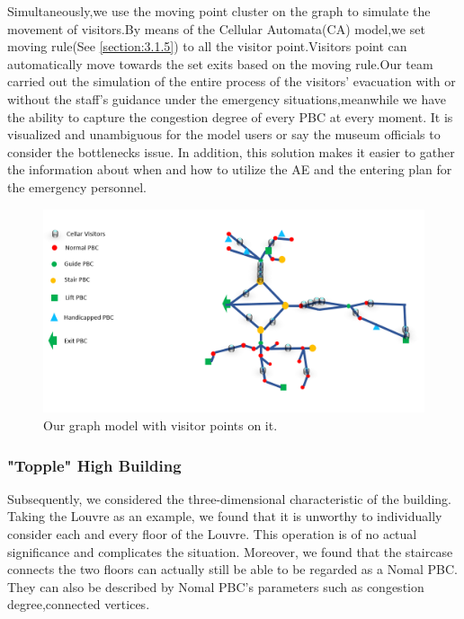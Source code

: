 \documentclass[12pt]{article}
\begin{document}
Simultaneously,we use the moving point cluster on the graph to simulate 
the movement of visitors.By means of the Cellular Automata(CA) model,we set moving rule(See \ref{section:3.1.5}) to all the visitor point.Visitors point can automatically move towards the set exits based on the moving rule.Our team carried out the simulation of the entire process of the visitors' evacuation with or without the staff's guidance under the emergency situations,meanwhile we have the ability to capture the congestion degree of every PBC at every moment.
It is visualized and unambiguous for the model users or say the museum officials to consider the bottlenecks issue. In addition, this solution makes it easier to gather the information about when and how to utilize the AE and the entering plan for the emergency personnel.

\begin{figure}[h]
	\centering
	\includegraphics[scale=0.3]{figure3.png}
	\caption{Our graph model with visitor points on it.}
	\label{fig:fig7}
\end{figure}


\subsubsection{"Topple" High Building} \label{section:3.1.4}

Subsequently, we considered the three-dimensional characteristic of the building. 
Taking the Louvre as an example, we found that it is unworthy to individually consider each and every floor of the Louvre. This operation is of no actual significance and complicates the situation.
Moreover, we found that the staircase connects the two floors can
actually still be able to be regarded as a Nomal PBC. They can also be described by Nomal PBC's parameters such as congestion degree,connected vertices.
\end{document}
